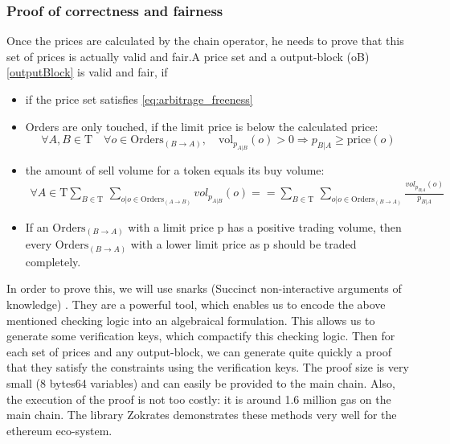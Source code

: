 \documentclass[11pt,parskip=full]{scrartcl}%
\newcommand{\Tau}{\mathrm{T}}
\begin{document}
\subsubsection{Proof of correctness and fairness}
Once the prices are calculated by the chain operator, he needs to prove that this set of prices is actually valid and fair.A price set and a output-block (oB) \ref{outputBlock} is valid and fair, if
\begin{itemize}

\item if the price set satisfies \ref{eq:arbitrage_freeness} 
\item Orders are only touched, if the limit price is below the calculated price:\newline
\begin{equation} \forall A,B \in \Tau \quad \forall o \in \text{Orders}_{(B\rightarrow A)}, \quad \text{vol}_{p_{A|B}}(o)>0 \Rightarrow p_{B|A}\geq \text{price}(o)
\end{equation}
\item the amount of sell volume for a token equals its buy volume: 
\begin{equation}
\begin{split}
\forall A \in \Tau \sum_{B\in \Tau} \,
\sum_{o| o\in \text{Orders}_{(A\rightarrow B)}} vol_{p_{A|B}}(o) == \sum_{B\in \Tau} \, \sum_{o| o\in \text{Orders}_{(B\rightarrow A)}} \frac{vol_{p_{B|A}}(o)}{p_{B|A}}
\end{split}
\end{equation}
\item If an $\text{Orders}_{(B\rightarrow A)}$ with a limit price p has a positive trading volume, then every $\text{Orders}_{(B\rightarrow A)}$ with a lower limit price as p should be traded completely.
\end{itemize}

In order to prove this, we will use snarks (Succinct non-interactive arguments of knowledge) \cite{snarks}.
They are a powerful tool, which enables us to encode the above mentioned checking logic into an algebraical formulation.
This allows us to generate some verification keys, which compactify this checking logic.
Then for each set of prices and any output-block, we can generate quite quickly a proof that they satisfy the constraints using the verification keys.
The proof size is very small (8 bytes64 variables) and can easily be provided to the main chain.
Also, the execution of the proof is not too costly: it is around 1.6 million gas on the main chain.
The library Zokrates demonstrates these methods very well for the ethereum eco-system.
\end{document}
